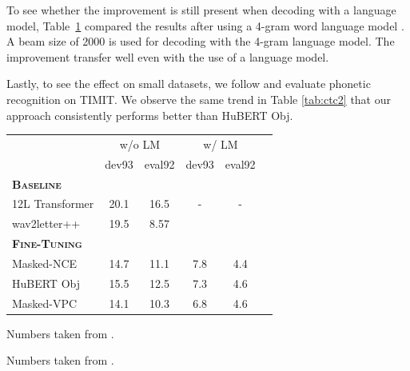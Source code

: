 To see whether the improvement is still present when decoding with a language model, Table~\ref{tab:ctc-lm} compared the results after using a 4-gram word language model \citep{heafield2013scalable}.
A beam size of 2000 is used for decoding with the 4-gram language model.
The improvement transfer well even with the use of a language model.

Lastly, to see the effect on small datasets, we follow \citet{baevski2020wav2vec} and evaluate phonetic recognition on TIMIT.
%
%
%
%
%
%
We observe the same trend in Table \ref{tab:ctc2} that our approach consistently performs better than HuBERT Obj.

\begin{table}[t]
\centering
{}
\label{tab:ctc-lm}
\begin{threeparttable}
\footnotesize
\begin{tabularx}{0.97\linewidth}{lccccc}
  \toprule
                                & \multicolumn{2}{c}{w/o LM} &\multicolumn{2}{c}{w/ LM} \\
                                & dev93 & eval92  &dev93 &eval92 \\
  \midrule
  \textbf{\textsc{Baseline}} &&&&\\[1pt]
    12L Transformer\tnote{\ddag} &20.1 &16.5 &- &-\\
    wav2letter++ \tnote{\dag}     &19.5     &8.57 &&\\
  \midrule
  \multicolumn{3}{l}{\textbf{\textsc{Fine-Tuning}}} &\\[1pt]
    Masked-NCE                     &14.7 &11.1  &7.8 &4.4 \\
    HuBERT Obj                     &15.5  &12.5 &7.3  &4.6\\
    Masked-VPC                     &14.1  &10.3 &6.8  &4.6\\
  \bottomrule
\end{tabularx}
\begin{tablenotes}\footnotesize
\item[\ddag] Numbers taken from \citet{lee2021intermediate}.
\item[\dag] Numbers taken from \citet{baevski2019vq}.
\end{tablenotes}
\end{threeparttable}
\end{table}

